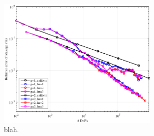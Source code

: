 \begin{figure}
\centering
\includegraphics[width=0.70\textwidth]{figures/sec_BF/SL_MAXENT_Err.eps}
\caption{blah.}
\label{fig::BF_Results_SL_MAXENT_err}
\end{figure}

